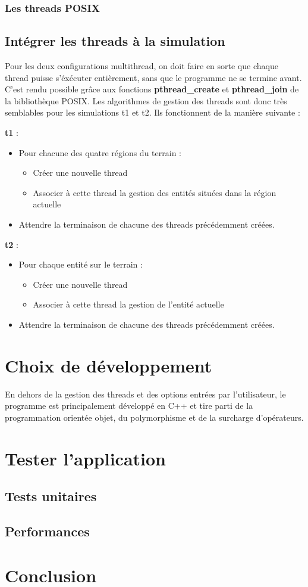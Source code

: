 \documentclass[11pt]{article} %
\begin{document}
\subsubsection{Les threads POSIX}

\subsection{Intégrer les threads à la simulation}
Pour les deux configurations multithread, on doit faire en sorte que chaque thread puisse s'éxécuter entièrement, sans que le programme ne se termine avant. C'est rendu possible grâce aux fonctions \textbf{pthread\_create} et \textbf{pthread\_join} de la bibliothèque POSIX. Les algorithmes de gestion des threads sont donc très semblables pour les simulations t1 et t2. Ils fonctionnent de la manière suivante : 

\newpage

\textbf{t1} :
\begin{itemize}
\item Pour chacune des quatre régions du terrain :
	\begin{itemize}
		\item Créer une nouvelle thread
		\item Associer à cette thread la gestion des entités situées dans la région actuelle
	\end{itemize}

\item Attendre la terminaison de chacune des threads précédemment créées.

\end{itemize} 
 
\textbf{t2} :
\begin{itemize}
\item Pour chaque entité sur le terrain :
	\begin{itemize}
		\item Créer une nouvelle thread
		\item Associer à cette thread la gestion de l'entité actuelle
	\end{itemize}

\item Attendre la terminaison de chacune des threads précédemment créées.

\end{itemize}

\section{Choix de développement}
En dehors de la gestion des threads et des options entrées par l'utilisateur, le programme est principalement développé en C++ et tire parti de la programmation orientée objet, du polymorphisme et de la surcharge d'opérateurs.

\section{Tester l'application}
\subsection{Tests unitaires}
\subsection{Performances}

\section{Conclusion}
\end{document}
